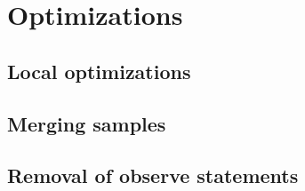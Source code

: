 \documentclass{article}
\begin{document}
\section{Optimizations}

\subsection{Local optimizations}

\subsection{Merging samples}

\subsection{Removal of observe statements}
\end{document}

